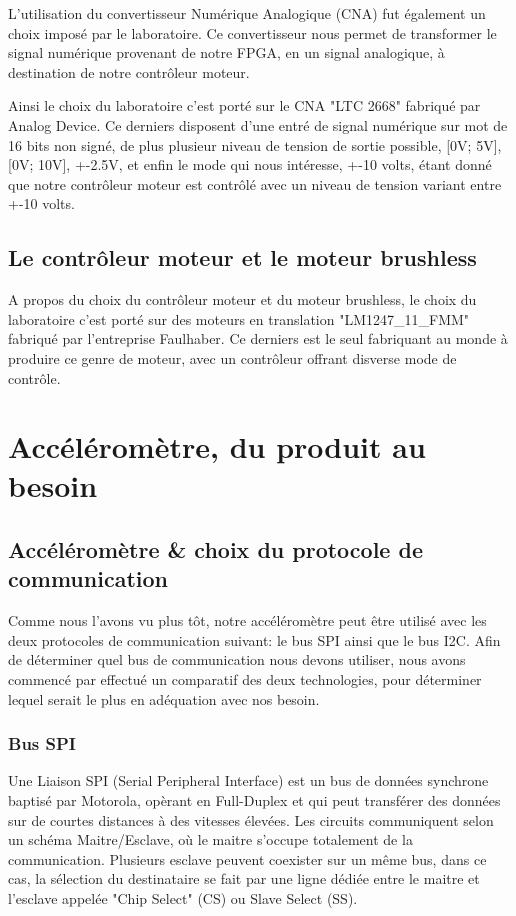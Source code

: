 \documentclass[french,a4paper,12pt]{report}
\begin{document}
			L'utilisation du convertisseur Numérique Analogique (CNA) fut également un choix imposé par le laboratoire.
			Ce convertisseur nous permet de transformer le signal numérique provenant de notre FPGA, en un signal analogique, à destination de notre contrôleur moteur.
			
			Ainsi le choix du laboratoire c'est porté sur le CNA "LTC 2668" fabriqué par Analog Device.
			Ce derniers disposent d'une entré de signal numérique sur mot de 16 bits non signé, de plus plusieur niveau de tension de sortie possible, [0V; 5V], [0V; 10V], +-2.5V, et enfin le mode qui nous intéresse, +-10 volts, étant donné que notre contrôleur moteur est contrôlé avec un niveau de tension variant entre +-10 volts.			
	
			\section{Le contrôleur moteur et le moteur brushless}
			
			A propos du choix du contrôleur moteur et du moteur brushless, le choix du laboratoire c'est porté sur des moteurs en translation "LM1247\_11\_FMM" fabriqué par l'entreprise Faulhaber. Ce derniers est le seul fabriquant au monde à produire ce genre de moteur, avec un contrôleur offrant disverse mode de contrôle.
			
			
		\chapter{Accéléromètre, du produit au besoin}
			
			\section{Accéléromètre \& choix du protocole de communication}
				Comme nous l'avons vu plus tôt, notre accéléromètre peut être utilisé avec les deux protocoles de communication suivant: le bus SPI ainsi que le bus I2C. Afin de déterminer quel bus de communication nous devons utiliser, nous avons commencé par effectué un comparatif des deux technologies, pour déterminer lequel serait le plus en adéquation avec nos besoin.
				
			\subsection{Bus SPI}
			
			Une Liaison SPI (Serial Peripheral Interface) est un bus de données synchrone baptisé par Motorola, opèrant en Full-Duplex et qui peut transférer des données sur de courtes distances à des vitesses élevées. Les circuits communiquent selon un schéma Maitre/Esclave, où le maitre s'occupe totalement de la communication. Plusieurs esclave peuvent coexister sur un même bus, dans ce cas, la sélection du destinataire se fait par une ligne dédiée entre le maitre et l'esclave appelée "Chip Select" (CS) ou Slave Select (SS).
 
\end{document}
